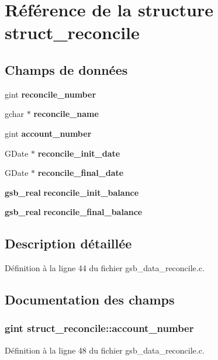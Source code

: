 \section{Référence de la structure struct\_\-reconcile}
\label{structstruct__reconcile}
\subsection*{Champs de données}
\begin{DoxyCompactItemize}
\item 
gint {\bf reconcile\_\-number}
\item 
gchar $\ast$ {\bf reconcile\_\-name}
\item 
gint {\bf account\_\-number}
\item 
GDate $\ast$ {\bf reconcile\_\-init\_\-date}
\item 
GDate $\ast$ {\bf reconcile\_\-final\_\-date}
\item 
{\bf gsb\_\-real} {\bf reconcile\_\-init\_\-balance}
\item 
{\bf gsb\_\-real} {\bf reconcile\_\-final\_\-balance}
\end{DoxyCompactItemize}


\subsection{Description détaillée}


Définition à la ligne 44 du fichier gsb\_\-data\_\-reconcile.c.



\subsection{Documentation des champs}
\subsubsection[{account\_\-number}]{\setlength{\rightskip}{0pt plus 5cm}gint {\bf struct\_\-reconcile::account\_\-number}}\label{structstruct__reconcile_ac8ddc427b6c5c00b375726620e2801ef}


Définition à la ligne 48 du fichier gsb\_\-data\_\-reconcile.c.

